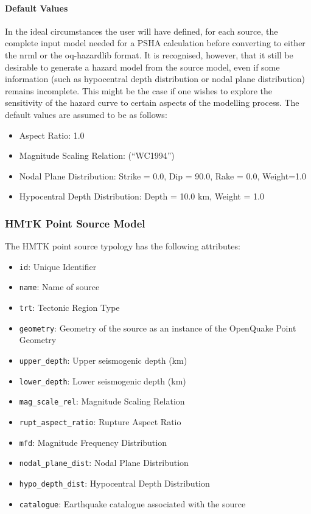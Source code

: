 \paragraph{Default Values}

In the ideal circumstances the user will have defined, for each source, the complete input model needed for a PSHA calculation before converting to either the nrml or the oq-hazardlib format. It is recognised, however, that it still be desirable to generate a hazard model from the source model, even if some information (such as hypocentral depth distribution or nodal plane distribution) remains incomplete. This might be the case if one wishes to explore the sensitivity of the hazard curve to certain aspects of the modelling process. The default values are assumed to be as follows:

\begin{itemize}
\item Aspect Ratio: 1.0
\item Magnitude Scaling Relation: \textcite{wells1994} (``WC1994'')
\item Nodal Plane Distribution: Strike = 0.0, Dip = 90.0, Rake = 0.0, Weight=1.0
\item Hypocentral Depth Distribution: Depth = 10.0 km, Weight = 1.0
\end{itemize}

\subsubsection{HMTK Point Source Model}

The HMTK point source typology has the following attributes:

\begin{itemize}

\item \verb=id=: Unique Identifier
\item \verb=name=: Name of source
\item \verb=trt=: Tectonic Region Type
\item \verb=geometry=: Geometry of the source as an instance of the OpenQuake Point Geometry 
\item \verb=upper_depth=: Upper seismogenic depth (km)
\item \verb=lower_depth=: Lower seismogenic depth (km)
\item \verb=mag_scale_rel=: Magnitude Scaling Relation
\item \verb=rupt_aspect_ratio=: Rupture Aspect Ratio
\item \verb=mfd=: Magnitude Frequency Distribution
\item \verb=nodal_plane_dist=: Nodal Plane Distribution
\item \verb=hypo_depth_dist=: Hypocentral Depth Distribution
\item \verb=catalogue=: Earthquake catalogue associated with the source
\end{itemize}

